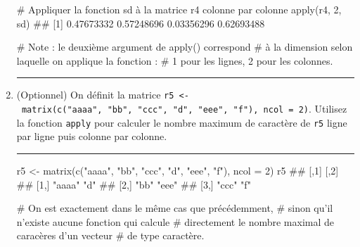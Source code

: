 \documentclass[12pt,twosided, notitlepage]{book}
\newenvironment{Shaded}{}{}
\newcommand{\KeywordTok}[1]{\textcolor[rgb]{0.00,0.00,1.00}{{#1}}}
\newcommand{\DataTypeTok}[1]{{#1}}
\newcommand{\DecValTok}[1]{{#1}}
\newcommand{\StringTok}[1]{\textcolor[rgb]{0.00,0.50,0.50}{{#1}}}
\newcommand{\CommentTok}[1]{\textcolor[rgb]{0.00,0.50,0.00}{{#1}}}
\newcommand{\NormalTok}[1]{{#1}}
\newif \ifsol
\renewenvironment{Shaded}{\begin{snugshade}}{\end{snugshade}}
\begin{document}
\begin{enumerate}
\begin{Shaded}
\begin{Highlighting}[]
\CommentTok{# Appliquer la fonction sd à la matrice r4 colonne par colonne}
\KeywordTok{apply}\NormalTok{(r4, }\DecValTok{2}\NormalTok{, sd)}
  \NormalTok{## [1] 0.47673332 0.57248696 0.03356296 0.62693488}

\CommentTok{# Note : le deuxième argument de apply() correspond }
\CommentTok{# à la dimension selon laquelle on applique la fonction : }
\CommentTok{# 1 pour les lignes, 2 pour les colonnes.}
\end{Highlighting}
\end{Shaded}

  \begin{center} \rule{0.5\linewidth}{\linethickness}\end{center}

  \bigskip  \fi 
\item
  (Optionnel) On définit la matrice
  \texttt{r5\ \textless{}-\ matrix(c("aaaa",\ "bb",\ "ccc",\ "d",\ "eee",\ "f"),\ ncol\ =\ 2)}.
  Utilisez la fonction \texttt{apply} pour
  calculer le nombre maximum de caractère de \texttt{r5} ligne par ligne
  puis colonne par colonne.

  \ifsol  \textbf{Indication} Créez la fonction \texttt{maxnchar()} qui
  renvoie, pour un vecteur caractère donné, la longueur en nombre de
  caractères de son élément le plus long. Utilisez ensuite cette
  fonction avec \texttt{apply()} pour obtenir le résultat attendu.\fi 

  \ifsol 

  \begin{center} \rule{0.5\linewidth}{\linethickness}\end{center}

\begin{Shaded}
\begin{Highlighting}[]
\NormalTok{r5 <-}\StringTok{ }\KeywordTok{matrix}\NormalTok{(}\KeywordTok{c}\NormalTok{(}\StringTok{"aaaa"}\NormalTok{, }\StringTok{"bb"}\NormalTok{, }\StringTok{"ccc"}\NormalTok{, }\StringTok{"d"}\NormalTok{, }\StringTok{"eee"}\NormalTok{, }\StringTok{"f"}\NormalTok{), }\DataTypeTok{ncol =} \DecValTok{2}\NormalTok{)}
\NormalTok{r5}
  \NormalTok{##      [,1]   [,2] }
  \NormalTok{## [1,] "aaaa" "d"  }
  \NormalTok{## [2,] "bb"   "eee"}
  \NormalTok{## [3,] "ccc"  "f"}

\CommentTok{# On est exactement dans le même cas que précédemment, }
\CommentTok{# sinon qu'il n'existe aucune fonction qui calcule }
\CommentTok{# directement le nombre maximal de caracères d'un vecteur}
\CommentTok{# de type caractère. }


\end{Highlighting}
\end{Shaded}
\end{enumerate}
\end{document}
